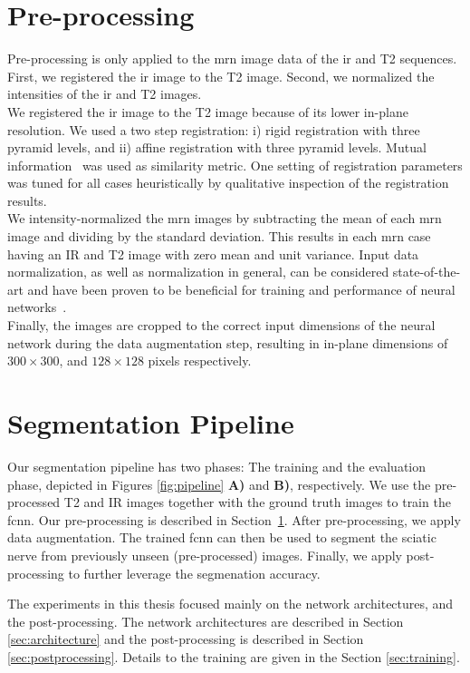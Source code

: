 \section{Pre-processing} \label{sec:preprocessing}
Pre-processing is only applied to the \gls{mrn} image data of the \gls{ir} and T2 sequences. First, we registered the \gls{ir} image to the T2 image. Second, we normalized the intensities of the \gls{ir} and T2 images.\\
We registered the \gls{ir} image to the T2 image because of its lower in-plane resolution. We used a two step registration: i) rigid registration with three pyramid levels, and ii) affine registration with three pyramid levels. Mutual information~\cite{Maes1997MultimodalityInformation} was used as similarity metric. One setting of registration parameters was tuned for all cases heuristically by qualitative inspection of the registration results.\\
We intensity-normalized the \gls{mrn} images by subtracting the mean of each \gls{mrn} image and dividing by the standard deviation. This results in each \gls{mrn} case having an IR and T2 image with zero mean and unit variance. Input data normalization, as well as normalization in general, can be considered state-of-the-art and have been proven to be beneficial for training and performance of neural networks~\cite{Sola1997ImportanceProblems,SergeyIoffe2015BatchNormalization}.\\
Finally, the images are cropped to the correct input dimensions of the neural network during the data augmentation step, resulting in in-plane dimensions of $300 \times 300$, and $128 \times 128$ pixels respectively.


\section{Segmentation Pipeline}
Our segmentation pipeline has two phases: The training and the evaluation phase, depicted in Figures \ref{fig:pipeline} \textbf{A)} and \textbf{B)}, respectively. We use the pre-processed T2 and IR images together with the ground truth images to train the \gls{fcnn}. Our pre-processing is described in Section~\ref{sec:preprocessing}. After pre-processing, we apply data augmentation. The trained \gls{fcnn} can then be used to segment the sciatic nerve from previously unseen (pre-processed) images. Finally, we apply post-processing to further leverage the segmenation accuracy.

The experiments in this thesis focused mainly on the network architectures, and the post-processing. The network architectures are described in Section \ref{sec:architecture} and the post-processing is described in Section~ \ref{sec:postprocessing}. Details to the training are given in the Section \ref{sec:training}.

